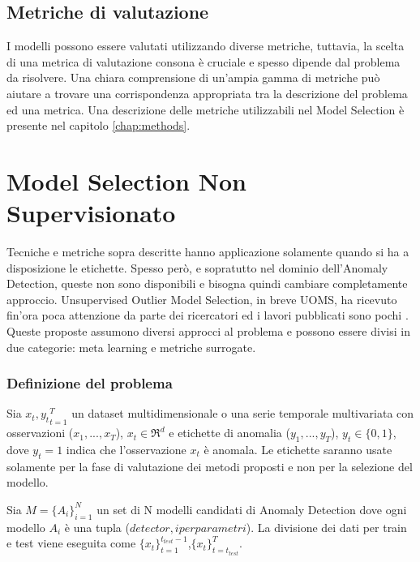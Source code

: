\subsection{Metriche di valutazione}
I modelli possono essere valutati utilizzando diverse metriche, tuttavia, la scelta di una metrica di valutazione consona è cruciale e spesso dipende dal problema da risolvere. Una chiara comprensione di un'ampia gamma di metriche può aiutare a trovare una corrispondenza appropriata tra la descrizione del problema ed una metrica.
Una descrizione delle metriche utilizzabili nel Model Selection è presente nel capitolo \ref{chap:methods}.

\section{Model Selection Non Supervisionato}
Tecniche e metriche sopra descritte hanno applicazione solamente quando si ha a disposizione le etichette. Spesso però, e sopratutto nel dominio dell'Anomaly Detection, queste non sono disponibili e bisogna quindi cambiare completamente approccio. 
Unsupervised Outlier Model Selection, in breve UOMS, ha ricevuto fin'ora poca attenzione da parte dei ricercatori ed i lavori pubblicati sono pochi  \cite{https://doi.org/10.48550/arxiv.2211.01834, https://doi.org/10.48550/arxiv.2210.01078, clei2022n,https://doi.org/10.48550/arxiv.1212.0960, https://doi.org/10.48550/arxiv.2009.10606, https://doi.org/10.48550/arxiv.2104.01422}. Queste proposte assumono diversi approcci al problema e possono essere divisi in due categorie: meta learning e metriche surrogate.

\subsubsection{Definizione del problema}
Sia \({x_t,y_t}^T_{t=1}\) un dataset multidimensionale o una serie temporale multivariata con osservazioni (\(x_1,...,x_T\)), \(x_t\in\Re^d\) e etichette di anomalia (\(y_1,...,y_T\)), \(y_t \in \{0,1\}\), dove \(y_t=1\) indica che l'osservazione \(x_t\) è anomala. Le etichette saranno usate solamente per la fase di valutazione dei metodi proposti e non per la selezione del modello.

Sia \(M=\{A_i\}^N_{i=1}\) un set di N modelli candidati di Anomaly Detection dove ogni modello \(A_i\) è una tupla (\(detector, iperparametri\)).
La divisione dei dati per train e test viene eseguita come \(\{x_t\}_{t=1}^{t_{test}-1}\),\(\{x_t\}^{T}_{t=t_{test}}\).

